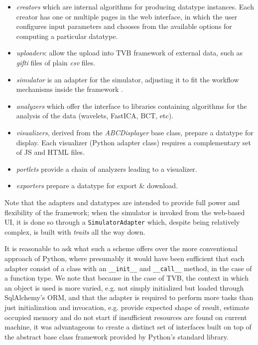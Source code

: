 \begin{itemize}
	\item \textit{creators} which are internal algorithms for producing datatype instances. 
		Each creator has one or multiple pages in the web interface, in which the user
		 configures input parameters and chooses from the available options for computing a particular datatype.

	\item \textit{uploaders}: allow the upload into TVB framework of external data, 
    		such as \emph{gifti} files of plain \emph{csv} files.

	\item \textit{simulator} is an adapter for the simulator, adjusting it to fit
		the workflow mechanisms inside the framework .

	\item \textit{analyzers} which offer the interface to libraries containing algorithms 
		for the analysis of the data (wavelets, FastICA, BCT, etc).

	\item \textit{visualizers}, derived from the \emph{ABCDisplayer} base class, prepare a datatype
		for display. Each visualizer (Python adapter class) requires a complementary set
		of JS and HTML files. 

	\item \textit{portlets} provide a chain of analyzers leading to a visualizer.

	\item \textit{exporters} prepare a datatype for export \& download.

\end{itemize}

Note that the adapters and datatypes are intended to provide full 
power and flexibility of the framework; when the simulator is invoked from
the web-based UI, it is done so through a \texttt{SimulatorAdapter} which,
despite being relatively complex, is built with \emph{traits} all the way down.

It is reasonable to ask what such a scheme offers over the more 
conventional approach of Python, where presumably it would have been
sufficient that each adapter consist of a class with an \texttt{\_\_init\_\_}
and \texttt{\_\_call\_\_} method, in the case of a function type. 
We note that because in the case of TVB, the context in which an object
is used is more varied, e.g. not simply initialized but loaded through 
SqlAlchemy's ORM, and that the adapter is required to perform more tasks
than just initialization and invocation, e.g. provide expected shape of 
result, estimate occupied memory and do not start if insufficient resources are found on current machine,
 it was advantageous to create a distinct set of interfaces built on top of
the abstract base class framework provided by Python's standard library.

